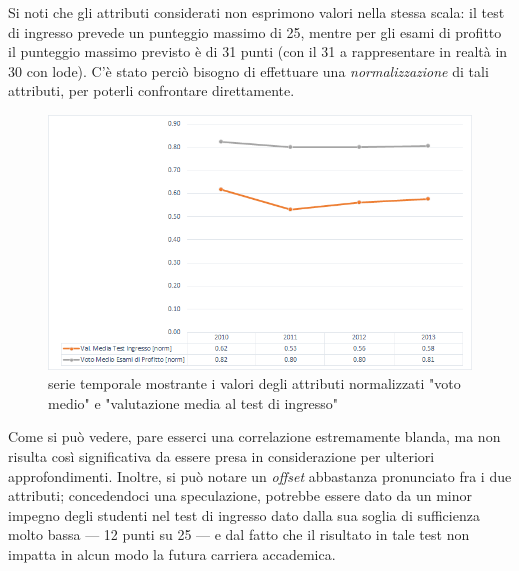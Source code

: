     Si noti che gli attributi considerati non esprimono valori nella stessa scala: il test di ingresso prevede un punteggio massimo di 25, mentre per gli esami di profitto il punteggio massimo previsto è di 31 punti (con il 31 a rappresentare in realtà in 30 con lode). C'è stato perciò bisogno di effettuare una \textit{normalizzazione} di tali attributi, per poterli confrontare direttamente. \\

    \begin{figure}
        \centering
        \caption{serie temporale mostrante i valori degli attributi normalizzati "voto medio" e "valutazione media al test di ingresso"}
        \label{test}
        \includegraphics[scale=0.45]{../visual/stud_2.png}
    \end{figure}

    Come si può vedere, pare esserci una correlazione estremamente blanda, ma non risulta così significativa da essere presa in considerazione per ulteriori approfondimenti. Inoltre, si può notare un \textit{offset} abbastanza pronunciato fra i due attributi; concedendoci una speculazione, potrebbe essere dato da un minor impegno degli studenti nel test di ingresso dato dalla sua soglia di sufficienza molto bassa --- 12 punti su 25 --- e dal fatto che il risultato in tale test non impatta in alcun modo la futura carriera accademica. \\

